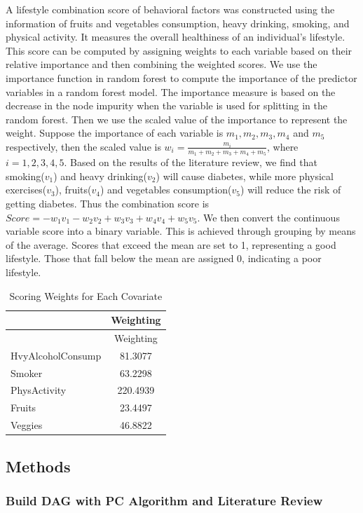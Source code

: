 \documentclass[
  12pt,
]{article}
\begin{document}
A lifestyle combination score of behavioral factors was constructed
using the information of fruits and vegetables consumption, heavy
drinking, smoking, and physical activity. It measures the overall
healthiness of an individual's lifestyle. This score can be computed by
assigning weights to each variable based on their relative importance
and then combining the weighted scores. We use the importance function
in random forest to compute the importance of the predictor variables in
a random forest model. The importance measure is based on the decrease
in the node impurity when the variable is used for splitting in the
random forest. Then we use the scaled value of the importance to
represent the weight. Suppose the importance of each variable is
\(m_1, m_2, m_3, m_4\) and \(m_5\) respectively, then the scaled value
is \(w_i=\frac{m_i}{m_1+m_2+m_3+m_4+m_5}\), where \(i=1,2,3,4,5\). Based
on the results of the literature review, we find that smoking(\(v_1\))
and heavy drinking(\(v_2\)) will cause diabetes, while more physical
exercises(\(v_3\)), fruits(\(v_4\)) and vegetables consumption(\(v_5\))
will reduce the risk of getting diabetes. Thus the combination score is
\(Score=-w_1v_1-w_2v_2+w_3v_3+w_4v_4+w_5v_5\). We then convert the
continuous variable score into a binary variable. This is achieved
through grouping by means of the average. Scores that exceed the mean
are set to 1, representing a good lifestyle. Those that fall below the
mean are assigned 0, indicating a poor lifestyle.

\begin{longtable}[]{@{}lc@{}}
\caption{Scoring Weights for Each Covariate}\tabularnewline
\toprule()
& Weighting \\
\midrule()
\endfirsthead
\toprule()
& Weighting \\
\midrule()
\endhead
HvyAlcoholConsump & 81.3077 \\
Smoker & 63.2298 \\
PhysActivity & 220.4939 \\
Fruits & 23.4497 \\
Veggies & 46.8822 \\
\bottomrule()
\end{longtable}

\hypertarget{methods}{%
\subsection{Methods}\label{methods}}

\hypertarget{build-dag-with-pc-algorithm-and-literature-review}{%
\subsubsection{Build DAG with PC Algorithm and Literature
Review}\label{build-dag-with-pc-algorithm-and-literature-review}}
\end{document}

